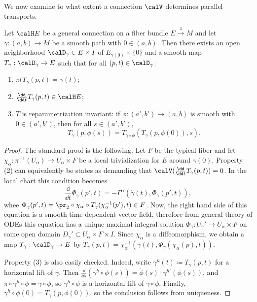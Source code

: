 We now examine to what extent a connection $\calV$ determines parallel transports.

\begin{thm}\label{prop parallel tra}
    Let $\calH E$ be a general connection on a fiber bundle $E\overset{\pi}{\to}M$ and let $\gamma:(a,b)\to M$ be a smooth path with $0\in(a,b)$. Then there exists an open neighborhood $\calD_\gamma\in E\times I$ of $E_{\gamma(0)}\times\{0\}$ and a smooth map $T_\gamma:\calD_\gamma\to E$ such that for all $(p,t)\in \calD_\gamma$: 
    \begin{enumerate}[label=(\arabic*)]
        \item $\pi(T_\gamma(p,t)=\gamma(t)$;
        \item $\frac{\dd}{\dd t}T_\gamma(p,t)\in \calH E$;
        \item $T$ is reparametrization invariant: if $\phi:(a',b')\to (a,b)$ is smooth with $0\in(a',b')$, then for all $s\in (a',b')$, 
        \[T_\gamma(p,\phi(s))=T_{\gamma\circ\phi}(T_\gamma(p,\phi(0)),s).\]
    \end{enumerate}
\end{thm}
\begin{proof}
    The standard proof is the following. Let $F$ be the typical fiber and let $\chi_\alpha:\pi^{-1}(U_\alpha)\to U_\alpha\times F$ be a local trivialization for $E$ around $\gamma(0)$. Property (2) can equivalently be states as demanding that $\calV(\frac{\dd}{\dd t}T_\gamma(p,t))=0$. In the local chart this condition becomes
    \[\frac{\dd}{\dd t}\Phi_\gamma(p',t)=-\Gamma^\alpha\left(\dot\gamma(t),\Phi_\gamma(p',t)\right),\]
    whee $\Phi_\gamma(p',t)=\pr_2\circ \chi_\alpha\circ T_\gamma(\chi_\alpha^{-1}(p'),t)\in F$. Now, the right hand side of this equation is a smooth time-dependent vector field, therefore from general theory of ODEs this equation has a unique maximal integral solution $\Phi_\gamma:U_\gamma'\to U_\alpha\times F$ on some open domain $D_\gamma'\subset U_\alpha\times F\times I$. Since $\chi_\alpha$ is a diffeomorphism, we obtain a map $T_\gamma:\calD_\gamma\to E$ by $T_\gamma(p,t)=\chi_\alpha^{-1}(\gamma(t),\Phi_\gamma(\chi_\alpha(p),t))$.

    Property (3) is also easily checked. Indeed, write $\gamma^h(t)\coloneqq T_\gamma(p,t)$ for a horizontal lift of $\gamma$. Then $\frac{\dd}{\dd s}(\gamma^h\circ \phi(s))=\dot\phi(s)\cdot \gamma^{h\prime}(\phi(s))$, and $\pi\circ\gamma^h\circ\phi=\gamma\circ\phi$, so $\gamma^h\circ\phi$ is a horizontal lift of $\gamma\circ\phi$. Finally, $\gamma^h\circ\phi(0)=T_\gamma(p,\phi(0))$, so the conclusion follows from uniqueness.
\end{proof}


